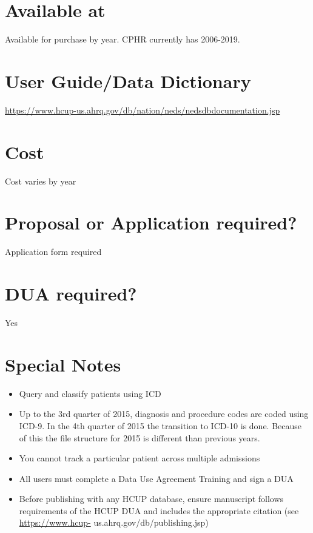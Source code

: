 \documentclass[
]{book}
\providecommand{\tightlist}{%
  \setlength{\itemsep}{0pt}\setlength{\parskip}{0pt}}
\begin{document}
\hypertarget{available-at-69}{%
\section{Available at}\label{available-at-69}}

Available for purchase by year. CPHR currently has 2006-2019.

\hypertarget{user-guidedata-dictionary-69}{%
\section{User Guide/Data Dictionary}\label{user-guidedata-dictionary-69}}

\url{https://www.hcup-us.ahrq.gov/db/nation/neds/nedsdbdocumentation.jsp}

\hypertarget{cost-69}{%
\section{Cost}\label{cost-69}}

Cost varies by year

\hypertarget{proposal-or-application-required-69}{%
\section{Proposal or Application required?}\label{proposal-or-application-required-69}}

Application form required

\hypertarget{dua-required-69}{%
\section{DUA required?}\label{dua-required-69}}

Yes

\hypertarget{special-notes-69}{%
\section{Special Notes}\label{special-notes-69}}

\begin{itemize}
\tightlist
\item
  Query and classify patients using ICD
\item
  Up to the 3rd quarter of 2015, diagnosis and procedure codes are coded using ICD-9. In the 4th quarter of 2015 the transition to ICD-10 is done. Because of this the file structure for 2015 is different than previous years.
\item
  You cannot track a particular patient across multiple admissions
\item
  All users must complete a Data Use Agreement Training and sign a DUA
\item
  Before publishing with any HCUP database, ensure manuscript follows requirements of the HCUP DUA and includes the appropriate citation (see \url{https://www.hcup-} us.ahrq.gov/db/publishing.jsp)
\end{itemize}
\end{document}
